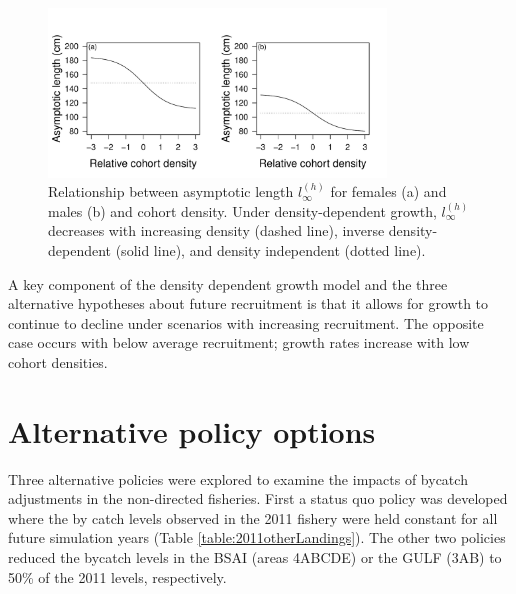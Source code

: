 \begin{figure}[htbp]
	\centering
		\includegraphics[width=0.8\textwidth]{../FIGURES/fig:pres:Linf.pdf}
	\caption{Relationship between asymptotic length $l_\infty^{(h)}$ for females (a) and males (b) and cohort density. Under density-dependent growth, $l_\infty^{(h)}$ decreases with increasing density (dashed line), inverse density-dependent (solid line), and density independent (dotted line).  }
	\label{fig:FIGURES_figLinf}
\end{figure}

A key component of the density dependent growth model and the three alternative hypotheses about future recruitment is that it allows for growth to continue to decline under scenarios with increasing recruitment.  The opposite case occurs with below average recruitment; growth rates increase with low cohort densities.  





\section{Alternative policy options} %
\label{sec:alternative_policy_options}

Three alternative policies were explored to examine the impacts of bycatch adjustments in the non-directed fisheries.  First a status quo policy was developed where the by catch levels observed in the 2011 fishery were held constant for all future simulation years (Table \ref{table:2011otherLandings}).  The other two policies reduced the bycatch levels in the BSAI (areas 4ABCDE) or the GULF (3AB) to 50\% of the 2011 levels, respectively.  

